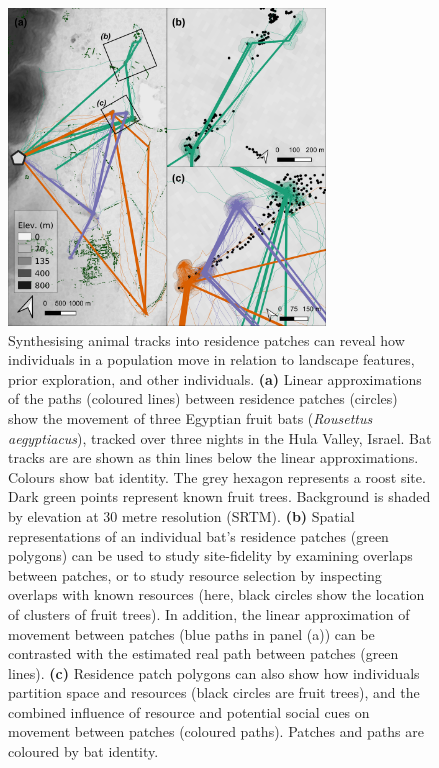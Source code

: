 \documentclass[10pt,paper=a4,headings=standardclasses
]{scrartcl}
\begin{document}
\begin{figure}[h!]
    \centering
    \includegraphics[width=0.75\textwidth]{figures/fig_07_bats.png}
    \caption{Synthesising animal tracks into residence patches can reveal how individuals in a population move in relation to landscape features, prior exploration, and other individuals.
    \textbf{(a)} Linear approximations of the paths (coloured lines) between residence patches (circles) show the movement of three Egyptian fruit bats (\textit{Rousettus aegyptiacus}), tracked over three nights in the Hula Valley, Israel.
    Bat tracks are are shown as thin lines below the linear approximations.
    Colours show bat identity. The grey hexagon represents a roost site.
    Dark green points represent known fruit trees.
    Background is shaded by elevation at 30 metre resolution (SRTM).    
    \textbf{(b)} Spatial representations of an individual bat's residence patches (green polygons) can be used to study site-fidelity by examining overlaps between patches, or to study resource selection by inspecting overlaps with known resources (here, black circles show the location of clusters of fruit trees).
    In addition, the linear approximation of movement between patches (blue paths in panel (a)) can be contrasted with the estimated real path between patches (green lines).
    \textbf{(c)} Residence patch polygons can also show how individuals partition space and resources (black circles are fruit trees), and the combined influence of resource and potential social cues on movement between patches (coloured paths).
    Patches and paths are coloured by bat identity.}
    \label{fig:figure_bats}
\end{figure}
\end{document}
